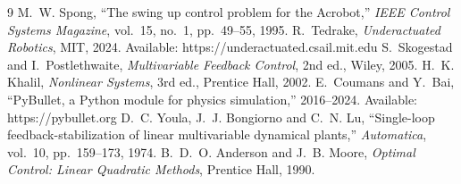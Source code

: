 \documentclass[12pt,a4paper]{article}
\begin{document}
\begin{thebibliography}{9}
 M.~W. Spong, ``The swing up control problem for the Acrobot,'' \emph{IEEE Control Systems Magazine}, vol.~15, no.~1, pp.~49--55, 1995.
 R.~Tedrake, \emph{Underactuated Robotics}, MIT, 2024. Available: https://underactuated.csail.mit.edu
 S.~Skogestad and I.~Postlethwaite, \emph{Multivariable Feedback Control}, 2nd ed., Wiley, 2005.
 H.~K. Khalil, \emph{Nonlinear Systems}, 3rd ed., Prentice Hall, 2002.
 E.~Coumans and Y.~Bai, ``PyBullet, a Python module for physics simulation,'' 2016--2024. Available: https://pybullet.org
 D.~C. Youla, J.~J. Bongiorno and C.~N. Lu, ``Single-loop feedback-stabilization of linear multivariable dynamical plants,'' \emph{Automatica}, vol.~10, pp.~159--173, 1974.
 B.~D.~O. Anderson and J.~B. Moore, \emph{Optimal Control: Linear Quadratic Methods}, Prentice Hall, 1990.
\end{thebibliography}
\end{document}
